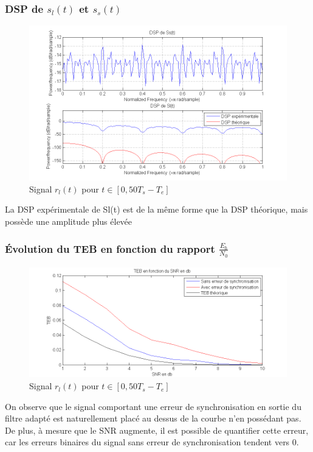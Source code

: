 \documentclass[11pt]{article}
\begin{document}
		\subsubsection{DSP de $s_l(t)$ et $s_s(t)$}
			\begin{figure}[h]
				\centering
				\includegraphics[scale=0.5]{images/Q314.png}
				\caption{Signal $r_l(t)$ pour $t \in [0, 50T_s-T_e]$}
				\label{Q314}
			\end{figure}
			La DSP expérimentale de Sl(t) est de la même forme que la DSP théorique, mais possède une amplitude plus élevée
			
\newpage
		
		\subsubsection{Évolution du TEB en fonction du rapport $\frac{E_b}{N_0}$}
			\begin{figure}[!ht]
				\centering
				\includegraphics[scale=0.5]{images/Q315-6.png}
				\caption{Signal $r_l(t)$ pour $t \in [0, 50T_s-T_e]$}
				\label{Q315-6}
			\end{figure}
			On observe que le signal comportant une erreur de synchronisation en sortie du filtre adapté est naturellement placé au dessus de la courbe n'en possédant pas.\\
			De plus, à mesure que le SNR augmente, il est possible de quantifier cette erreur, car les erreurs binaires du signal sans erreur de synchronisation tendent vers 0.
			
\end{document}
